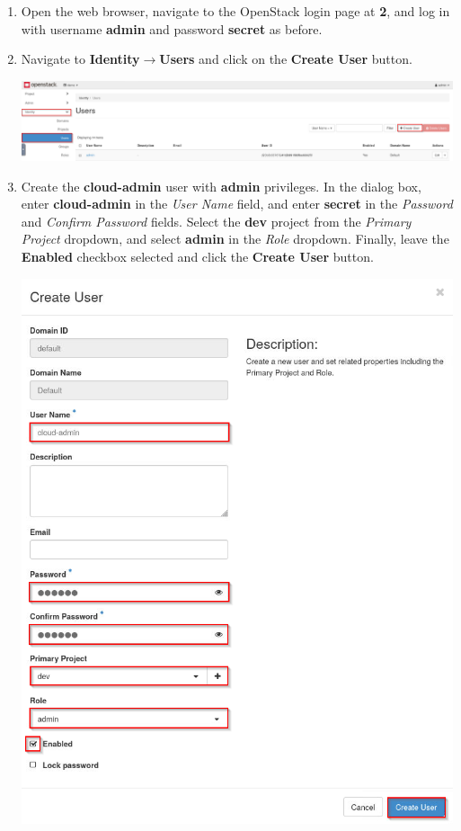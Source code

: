 \documentclass[letterpaper, 12pt]{article}
\begin{document}
\begin{enumerate}
    \item Open the web browser, navigate to the OpenStack login page at \textbf{2}, and log in with username
    \textbf{admin} and password \textbf{secret} as before.

    \item Navigate to \textbf{Identity$\rightarrow$Users} and click on the \textbf{Create User} button.
    
    \begin{center}
        \includegraphics[width=\linewidth]{images/part5/step2.png}
    \end{center}

    \item Create the \textbf{cloud-admin} user with \textbf{admin} privileges. In the dialog box, enter
    \textbf{cloud-admin} in the \textit{User Name} field, and enter \textbf{secret} in the \textit{Password} and
    \textit{Confirm Password} fields. Select the \textbf{dev} project from the \textit{Primary Project} dropdown, and
    select \textbf{admin} in the \textit{Role} dropdown. Finally, leave the \textbf{Enabled} checkbox selected and click
    the \textbf{Create User} button.

    \begin{center}
        \includegraphics[width=\linewidth]{images/part5/step3.png}
    \end{center}


\end{enumerate}
\end{document}
